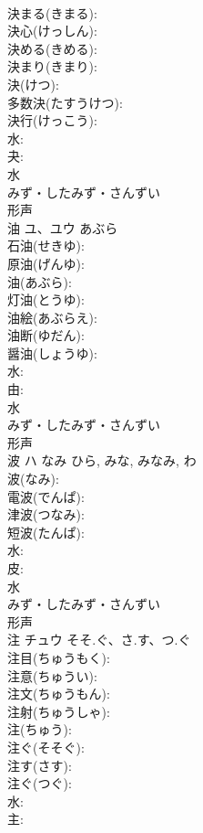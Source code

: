 \documentclass[8pt]{extreport}
\begin{document}
\begin{CJK}{UTF8}{min}
\\	決まる(きまる): 
\\	決心(けっしん): 
\\	決める(きめる): 
\\	決まり(きまり): 
\\	決(けつ): 
\\	多数決(たすうけつ): 
\\	決行(けっこう): 
\\	水: 
\\	夬: 
\\	水	
\\	みず・したみず・さんずい	
\\	形声 
\\	油	ユ、ユウ	あぶら		
\\	石油(せきゆ): 
\\	原油(げんゆ): 
\\	油(あぶら): 
\\	灯油(とうゆ): 
\\	油絵(あぶらえ): 
\\	油断(ゆだん): 
\\	醤油(しょうゆ): 
\\	水: 
\\	由: 
\\	水	
\\	みず・したみず・さんずい	
\\	形声 
\\	波	ハ	なみ	ひら, みな, みなみ, わ	
\\	波(なみ): 
\\	電波(でんぱ): 
\\	津波(つなみ): 
\\	短波(たんぱ): 
\\	水: 
\\	皮: 
\\	水	
\\	みず・したみず・さんずい	
\\	形声 
\\	注	チュウ	そそ.ぐ、さ.す、つ.ぐ		
\\	注目(ちゅうもく): 
\\	注意(ちゅうい): 
\\	注文(ちゅうもん): 
\\	注射(ちゅうしゃ): 
\\	注(ちゅう): 
\\	注ぐ(そそぐ): 
\\	注す(さす): 
\\	注ぐ(つぐ): 
\\	水: 
\\	主: 

\end{CJK}
\end{document}
